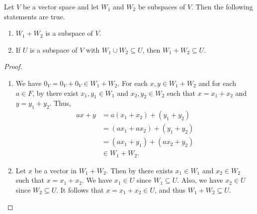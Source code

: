 \begin{proposition}\label{prop:subspace-sum}
  Let $V$ be a vector space and let $W_1$ and $W_2$ be subspaces of $V$.
  Then the following statements are true.
  \begin{enumerate}
    \item $W_1 + W_2$ is a subspace of $V$.
    \item If $U$ is a subspace of $V$ with $W_1 \cup W_2 \subseteq U$,
      then $W_1 + W_2 \subseteq U$.
  \end{enumerate}
\end{proposition}
\begin{proof} \leavevmode
  \begin{enumerate}
    \item We have $0_V = 0_V + 0_V \in W_1 + W_2$.
      For each $x, y \in W_1 + W_2$ and for each $a \in F$, by 
      there exist $x_1, y_1 \in W_1$ and $x_2, y_2 \in W_2$ such that
      $x = x_1 + x_2$ and $y = y_1 + y_2$.
      Thus,
      \begin{align*}
        ax + y
        &= a(x_1 + x_2) + (y_1 + y_2) \\
        &= (ax_1 + ax_2) + (y_1 + y_2) \\
        &= (ax_1 + y_1) + (ax_2 + y_2) \\
        &\in W_1 + W_2.
      \end{align*}
    \item Let $x$ be a vector in $W_1 + W_2$.
      Then by  there exists $x_1 \in W_1$ and $x_2 \in W_2$ such
      that $x = x_1 + x_2$.
      We have $x_1 \in U$ since $W_1 \subseteq U$.
      Also, we have $x_2 \in U$ since $W_2 \subseteq U$.
      It follows that $x = x_1 + x_2 \in U$, and thus $W_1 + W_2 \subseteq U$.
      \qedhere
  \end{enumerate}
\end{proof}

